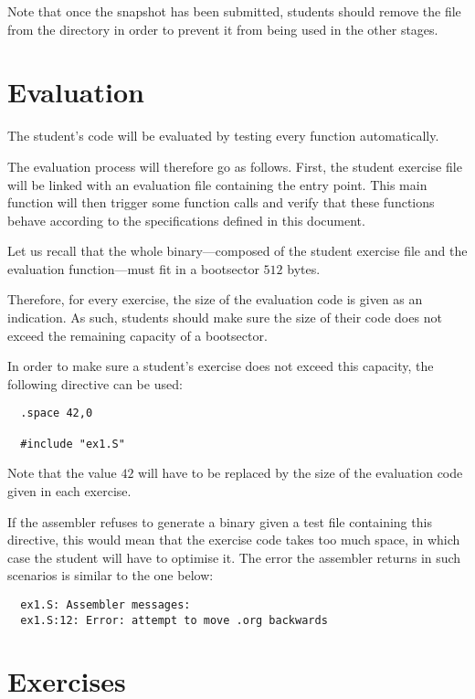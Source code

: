 Note that once the snapshot has been submitted, students should
remove the file from the  directory in order
to prevent it from being used in the other stages.

%
%

\section{Evaluation}

The student's code will be evaluated by testing every function automatically.

The evaluation process will therefore go as follows. First, the student
exercise file will be linked with an evaluation file containing the entry
point. This main function will then trigger some function calls and verify
that these functions behave according to the specifications defined in this
document.

Let us recall that the whole binary---composed of the student exercise file
and the evaluation function---must fit in a bootsector \ie{} $512$ bytes.

Therefore, for every exercise, the size of the evaluation code is given
as an indication. As such, students should make sure the size of their code
does not exceed the remaining capacity of a bootsector.

In order to make sure a student's exercise does not exceed this capacity,
the following directive can be used:

\begin{verbatim}
  .space 42,0

  #include "ex1.S"
\end{verbatim}

Note that the value $42$ will have to be replaced by the size of the
evaluation code given in each exercise.

If the assembler refuses to generate a binary given a test file containing
this directive, this would mean that the exercise code takes too much space,
in which case the student will have to optimise it. The error the assembler
returns in such scenarios is similar to the one below:

\begin{verbatim}
  ex1.S: Assembler messages:
  ex1.S:12: Error: attempt to move .org backwards
\end{verbatim}

%
%

\section{Exercises}

